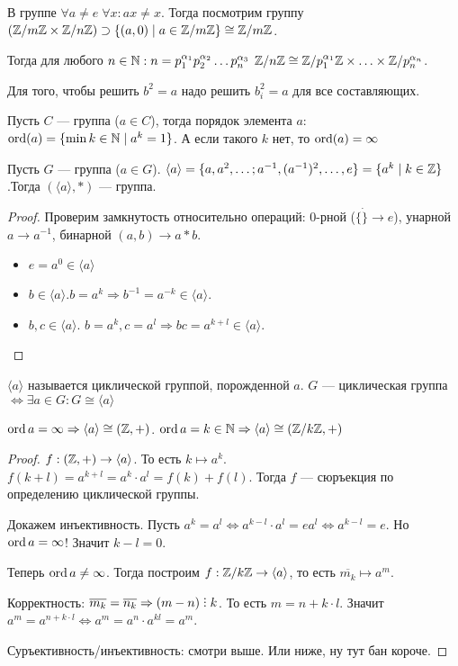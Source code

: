 В группе $\forall a \neq e\; \forall x: ax \neq x$. Тогда посмотрим группу  $(\mathbb{Z} / m\mathbb{Z} \times \mathbb{Z} / n\mathbb{Z}) \supset \{(a, 0) \mid a \in \mathbb{Z} / m\mathbb{Z}\} \cong \mathbb{Z} / m\mathbb{Z}$.
 
Тогда для любого $n \in \mathbb{N}: n = p_1^{\alpha_1} p_2^{\alpha_2}\ldots p_n^{\alpha_3}$  $\mathbb{Z} / n\mathbb{Z} \cong \mathbb{Z} / p_1^{\alpha_1}\mathbb{Z} \times \ldots \times \mathbb{Z} / p_n^{\alpha_n}$.
\begin{example}
    Для того, чтобы решить $b^2 = a$ надо решить  $b_i^2 = a$ для все составляющих.
\end{example}
\begin{definition}
    Пусть $C$ --- группа ($a \in C$), тогда порядок элемента $a$:  $\operatorname{ord}(a) = \{\min k \in \mathbb{N} \mid a^k = 1\}$. А если такого  $k$ нет, то  $\operatorname{ord}(a) = \infty$
\end{definition}
\begin{lemma}
    Пусть $G$ --- группа ($a \in G$). $\langle a \rangle = \{a, a^2,\ldots; a^{-1}, (a^{-1})^2, \ldots, e\} = \{a^k \mid k \in \mathbb{Z}\}$.Тогда $(\langle a \rangle, *)$ --- группа.
\end{lemma}
\begin{proof}
    Проверим замкнутость относительно операций: 0-рной ($\{\dot\} \to e$), унарной $a \to a^{-1}$, бинарной  $(a, b) \to a * b$.
    \begin{itemize}
        \item $e = a^0 \in \langle a \rangle$
        \item  $b \in \langle a \rangle. b = a^k \Rightarrow b^{-1} = a^{-k} \in \langle a \rangle$.
        \item  $b, c \in \langle a \rangle$.  $b = a^k, c = a^l \Rightarrow bc = a^{k+l} \in \langle a \rangle$.
    \end{itemize}
\end{proof}
\begin{definition}
    $\langle a \rangle$ называется циклической группой, порожденной  $a$.  $G$ --- циклическая группа  $ \iff \exists a \in G\!: G \cong \langle a \rangle$
\end{definition}
\begin{theorem}
    $\operatorname{ord} a = \infty \Rightarrow \langle a \rangle \cong (\mathbb{Z}, +)$.  $\operatorname{ord} a = k \in \mathbb{N} \Rightarrow \langle a \rangle \cong (\mathbb{Z} / k\mathbb{Z}, +)$
\end{theorem}
\begin{proof}
    $f: (\mathbb{Z}, +) \to \langle a \rangle$. То есть  $k \mapsto a^k$.  $f(k+l) = a^{k+l} = a^k \cdot a^l = f(k) + f(l)$. Тогда $f$ --- сюръекция по определению циклической группы.

    Докажем инъективность. Пусть $a^k = a^l \iff a^{k-l} \cdot a^l = e a^l \iff a^{k-l} = e$. Но  $\operatorname{ord} a = \infty$! Значит $k-l=0$.  

    Теперь $\operatorname{ord} a \neq \infty$. Тогда построим  $f: \mathbb{Z} / k \mathbb{Z} \to \langle a \rangle$, то есть  $\overline{m_k} \mapsto a^m$.

    Корректность:  $\overline{m_k} = \overline{n_k} \Rightarrow (m - n) \divby k$. То есть $m = n + k \cdot l$. Значит  $a^m = a^{n + k \cdot l} \iff a^m = a^n \cdot a^{kl} = a^m$.

    Суръективность/инъективность: смотри выше. Или ниже, ну тут бан короче.
\end{proof}
